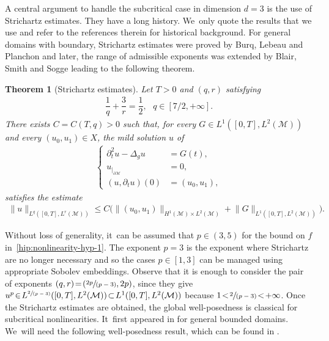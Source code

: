 \documentclass[10pt]{amsart}
\newcommand{\spfrac}[2]{\sfrac{#1}{(#2)}}
\newtheorem{theorem}{Theorem}[section]
\theoremstyle{definition}
\let\mc\mathcal
\newcommand{\M}{\mc{M}}
\providecommand{\norm}[1]{\lVert#1\rVert}
\begin{document}
A central argument to handle the subcritical case in dimension $d=3$ is the use of Strichartz estimates. They have a long history. We~only quote the results that we use and refer to the references therein for historical background. For general domains with boundary, Strichartz estimates were proved by Burq, Lebeau and Planchon \cite{BLP:08} and later, the range of admissible exponents was extended by Blair, Smith and Sogge \cite[Cor.\,1.2]{BSS:09} leading to the following theorem.

\begin{theorem}[Strichartz estimates]\label{thmStrichartz}
Let $T>0$ and $(q, r)$ satisfying
\begin{align}\label{thm:strichartz-exponents}
\dfrac{1}{q}+\dfrac{3}{r}=\dfrac{1}{2},\ \ \ q\in [7/2, +\infty].
\end{align}
There exists $C=C(T, q)>0$ such that, for every $G\in L^1([0, T], L^2(\M))$ and every $(u_0, u_1)\in X$, the mild solution $u$ of
\begin{align*}
\left\{\begin{array}{rl}
\partial_t^2 u-\Delta_g u&=G(t), \\[3pt]
u_{|_{\partial\M}}&=0, \\[3pt]
(u, \partial_t u)(0)&=(u_0, u_1),
\end{array}\right.
\end{align*}
satisfies the estimate
\begin{align*}
\norm{u}_{L^q([0, T], L^r(\M))}\leq C\big(\norm{(u_0, u_1)}_{H^1(\M)\times L^2(\M)}+\norm{G}_{L^1([0, T], L^2(\M))}\big).
\end{align*}
\end{theorem}

Without loss of generality, it~can be assumed that $p\in (3, 5)$ for the bound on $f$ in~\eqref{hip:nonlinearity-hyp-1}. The exponent $p=3$ is the exponent where Strichartz are no longer necessary and so the cases $p\in [1, 3]$ can be managed using appropriate Sobolev embeddings. Observe that it is enough to consider the pair of exponents $(q, r)\!=\!(\spfrac{2p}{p-3}, 2p)$, since they give $u^p\!\in\! L^{\spfrac{2}{p-3}}([0, T], L^2(\M))\!\subset\! L^1([0, T], L^2(\M))$ because \hbox{$1\!<\!\spfrac{2}{p-3}\!<\!+\infty$}. Once the Strichartz estimates are obtained, the global well-posedness is classical for subcritical nonlinearities. It~first appeared in \cite{BLP:08} for general bounded domains. We~will need the following well-posedness result, which can be found in \cite[Th.\,2.2]{JL13}.
\end{document}

